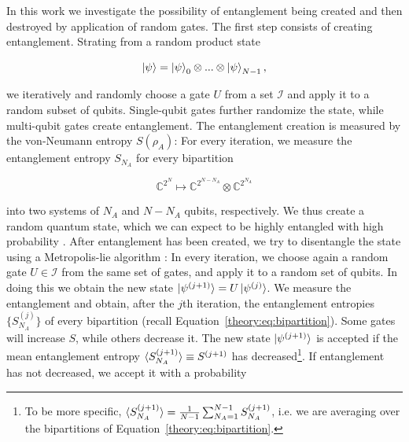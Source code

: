 \documentclass[reprint,amsmath,amssymb,aps,prb,nofootinbib]{revtex4-2}
\begin{document}
    \vspace{\baselineskip}

    In this work we investigate the possibility of entanglement being created and then destroyed by application of
    random gates. The first step consists of creating entanglement. Strating from a random product state

    \begin{equation}
        \ket{\psi}=\ket{\psi}_0\otimes...\otimes\ket{\psi}_{N-1},
    \end{equation}

    we iteratively and randomly choose a gate $U$ from a set $\mathcal{I}$ and apply it to a random subset of
    qubits. Single-qubit gates further randomize the state, while multi-qubit gates create entanglement. The
    entanglement creation is measured by the von-Neumann entropy $S(\rho_A)$: For every iteration, we measure
    the entanglement entropy $S_{N_A}$ for every bipartition

    \begin{equation}
        \mathbb{C}^{2^N}\mapsto\mathbb{C}^{2^{N-N_A}}\otimes\mathbb{C}^{2^{N_A}}
        \label{theory:eq:bipartition}
    \end{equation}

    into two systems of $N_A$ and $N-N_A$ qubits, respectively. We thus create a random quantum state, which we can
    expect to be highly entangled with high probability \cite{Page:1993:AverageEntropy,Hamma:2012:RandomQuantumEntanglement}.
    After entanglement has been created, we try to disentangle the state using a Metropolis-lie algorithm
    \cite{Shaffer:2014:IrreversibilityAndEntanglement,Odavic:2023:RandomUnitaries,Chamon:2014:EmergentIrreversibility}:
    In every iteration, we choose again a random gate $U\in\mathcal{I}$ from the same set of gates, and apply it to
    a random set of qubits. In doing this we obtain the new state $\ket{\psi^{(j+1)}}=U\ket{\psi^{(j)}}$. We measure
    the entanglement and obtain, after the $j$th iteration, the entanglement entropies $\{S_{N_A}^{(j)}\}$ of
    every bipartition (recall Equation~\ref{theory:eq:bipartition}). Some gates will increase $S$, while others
    decrease it. The new state $\ket{\psi^{(j+1)}}$ is accepted if the mean entanglement entropy $\braket{S_{N_A}^{(j+1)}}\equiv S^{(j+1)}$
    has decreased\footnote{To be more specific, $\braket{S_{N_A}^{(j+1)}}=\frac{1}{N-1}\sum_{N_A=1}^{N-1}S_{N_A}^{(j+1)}$,
    i.e. we are averaging over the bipartitions of Equation~\ref{theory:eq:bipartition}.}. If entanglement has not
    decreased, we accept it with a probability
\end{document}
